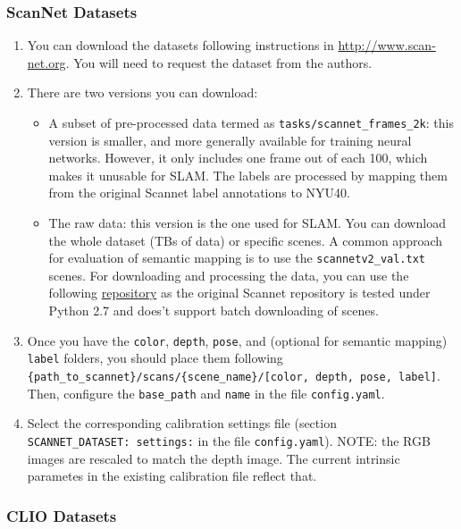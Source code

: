 \documentclass{article}
\providecommand{\tightlist}{%
  \setlength{\itemsep}{0pt}\setlength{\parskip}{0pt}}
\begin{document}
\hypertarget{scannet-datasets}{%
\subsubsection{ScanNet Datasets}\label{scannet-datasets}}

\begin{enumerate}
\def\labelenumi{\arabic{enumi}.}
\tightlist
\item
  You can download the datasets following instructions in
  \href{http://www.scan-net.org}{http://www.scan-net.org}. You will need to request the dataset from
  the authors.
\item
  There are two versions you can download:
\begin{itemize}
\tightlist
\item
  A subset of pre-processed data termed as
  \texttt{tasks/scannet\_frames\_2k}: this version is smaller, and more
  generally available for training neural networks. However, it only
  includes one frame out of each 100, which makes it unusable for SLAM.
  The labels are processed by mapping them from the original Scannet
  label annotations to NYU40.
\item
  The raw data: this version is the one used for SLAM. You can download
  the whole dataset (TBs of data) or specific scenes. A common approach
  for evaluation of semantic mapping is to use the
  \texttt{scannetv2\_val.txt} scenes. For downloading and processing the
  data, you can use the following
  \href{https://github.com/dvdmc/scannet-processing}{repository} as the
  original Scannet repository is tested under Python 2.7 and does't
  support batch downloading of scenes.
\end{itemize}
\item
  Once you have the \texttt{color}, \texttt{depth}, \texttt{pose}, and
  (optional for semantic mapping) \texttt{label} folders, you should
  place them following
  \texttt{\{path\_to\_scannet\}/scans/\{scene\_name\}/{[}color,\ depth,\ pose,\ label{]}}.
  Then, configure the \texttt{base\_path} and \texttt{name} in the file
  \texttt{config.yaml}.
\item
  Select the corresponding calibration settings file (section
  \texttt{SCANNET\_DATASET:\ settings:} in the file
  \texttt{config.yaml}). NOTE: the RGB images are rescaled to match the
  depth image. The current intrinsic parametes in the existing
  calibration file reflect that.
\end{enumerate}

\hypertarget{clio-datasets}{%
\subsubsection{CLIO Datasets}\label{clio-datasets}}
\end{document}
